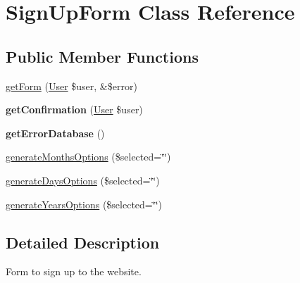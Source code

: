 \hypertarget{classSignUpForm}{\section{Sign\+Up\+Form Class Reference}
\label{classSignUpForm}
}
\subsection*{Public Member Functions}
\begin{DoxyCompactItemize}
\item 
\hyperlink{classSignUpForm_aa8e3a5c4549fa6c9d9d24d726526d73c}{get\+Form} (\hyperlink{classUser}{User} \$user, \&\$error)
\item 
\hypertarget{classSignUpForm_a0b21f4063e8f78696e8b7660835aae77}{{\bfseries get\+Confirmation} (\hyperlink{classUser}{User} \$user)}\label{classSignUpForm_a0b21f4063e8f78696e8b7660835aae77}

\item 
\hypertarget{classSignUpForm_ac54e5245ba11e58453cbdfdb300abda2}{{\bfseries get\+Error\+Database} ()}\label{classSignUpForm_ac54e5245ba11e58453cbdfdb300abda2}

\item 
\hyperlink{classSignUpForm_af62237948871c6323731dcd060045e90}{generate\+Months\+Options} (\$selected=\char`\"{}\char`\"{})
\item 
\hyperlink{classSignUpForm_ac974c200e5bb4597bd7f72a6771fa564}{generate\+Days\+Options} (\$selected=\char`\"{}\char`\"{})
\item 
\hyperlink{classSignUpForm_a39a216918e9ad775eecee2180f7b045c}{generate\+Years\+Options} (\$selected=\char`\"{}\char`\"{})
\end{DoxyCompactItemize}


\subsection{Detailed Description}
Form to sign up to the website. 

